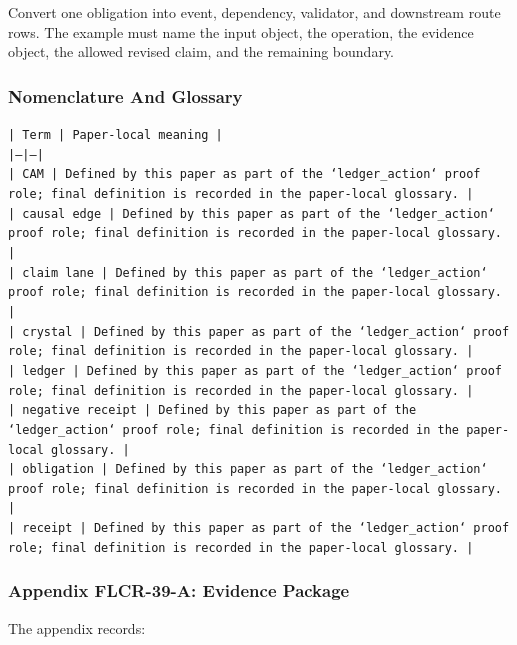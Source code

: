 \documentclass[11pt]{article}
\begin{document}
Convert one obligation into event, dependency, validator, and downstream route rows. The example must name the input object, the operation,
the evidence object, the allowed revised claim, and the remaining boundary.

\subsubsection*{Nomenclature And Glossary}

\noindent\texttt{| Term | Paper-local meaning |}\\
\noindent\texttt{|---|---|}\\
\noindent\texttt{| CAM | Defined by this paper as part of the `ledger\_action` proof role; final definition is recorded in the paper-local glossary. |}\\
\noindent\texttt{| causal edge | Defined by this paper as part of the `ledger\_action` proof role; final definition is recorded in the paper-local glossary. |}\\
\noindent\texttt{| claim lane | Defined by this paper as part of the `ledger\_action` proof role; final definition is recorded in the paper-local glossary. |}\\
\noindent\texttt{| crystal | Defined by this paper as part of the `ledger\_action` proof role; final definition is recorded in the paper-local glossary. |}\\
\noindent\texttt{| ledger | Defined by this paper as part of the `ledger\_action` proof role; final definition is recorded in the paper-local glossary. |}\\
\noindent\texttt{| negative receipt | Defined by this paper as part of the `ledger\_action` proof role; final definition is recorded in the paper-local glossary. |}\\
\noindent\texttt{| obligation | Defined by this paper as part of the `ledger\_action` proof role; final definition is recorded in the paper-local glossary. |}\\
\noindent\texttt{| receipt | Defined by this paper as part of the `ledger\_action` proof role; final definition is recorded in the paper-local glossary. |}\\

\subsubsection*{Appendix FLCR-39-A: Evidence Package}

The appendix records:
\end{document}

